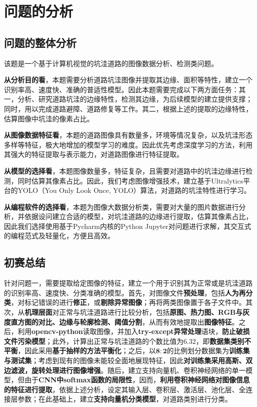 \documentclass{MathorCupmodeling}
\begin{document}
	\section{问题的分析}
	\subsection{问题的整体分析}
	该题是一个基于计算机视觉的坑洼道路的图像数据分析、检测类问题。

	\textbf{从分析目的看}，本题需要分析道路坑洼图像并提取其边缘、面积等特性，建立一个识别率高、速度快、准确的普适性模型。因此本题需要完成以下两方面任务：{\heiti 其一}，分析、研究道路坑洼的边缘特性，检测其边缘，为后续模型的建立提供支撑；同时，用以完成道路避障、道路修复等工作。{\heiti 其二}，根据上述的提取的边缘特性，估算图像中坑洼的像素占比。

	\textbf{从图像数据特征看}，本题的道路图像具有数量多，环境等情况复杂，以及坑洼形态多样等特征，极大地增加的模型学习的难度。因此优先考虑深度学习的方法，利用其强大的特征提取与表示能力，对道路图像进行特征提取。

	\textbf{从模型的选择看}，本题图像数量多，特征复杂，且需要对道路中的坑洼边缘进行检测，同时估算其像素占比。因此，我们考虑图像增强技术，建立基于Ultralytics平台的YOLO（You Only Look Once, YOLO）算法，对道路的坑洼特性进行学习。

	\textbf{从编程软件的选择看}，本题为图像大数据分析类，需要对大量的图片数据进行分析，并依据设问建立合适的模型，对坑洼道路的边缘进行提取，估算其像素占比，因此我们选择使用基于Pycharm内核的Python Jupyter对问题进行求解，其交互式的编程范式及轻量化，方便且高效。
	\subsection{初赛总结}
		{\heiti 针对问题一}，需要提取给定图像的特征，建立一个用于识别其为正常或是坑洼道路的识别率高、速度快、分类准确的模型。首先，对图像文件\textbf{预处理}，包括\textbf{人为再分类}，对标记错误的进行\textbf{修正}，或\textbf{剔除异常图像}；再将两类图像置于各子文件中。其次，从\textbf{机理层面}对正常与坑洼道路进行比较分析，包括\textbf{原图、热力图、RGB与灰度直方图的对比、边缘与轮廓检测、阈值分割}，从而有效地提取出\textbf{图像特征}。之后，利用\textbf{opencv-python}读取图像，并加入\textbf{try-except异常处理}语块，\textbf{防止破损文件污染模型}；此外，计算出正常与坑洼道路的个数比值为$\boldsymbol{6.32}$，即\textbf{数据集类别不平衡}，因此采用\textbf{基于抽样的方法平衡化}；之后，以$\boldsymbol{8:2}$的比例划分数据集为\textbf{训练集与测试集}；考虑到现有的图像未能较全面地展现特征，因此\textbf{对训练集采用高斯、双边滤波，旋转处理进行图像增强}。随后，建立支持向量机、卷积神经网络的单一模型，但由于\textbf{CNN中softmax函数的局限性}，因而，\textbf{利用卷积神经网络对图像信息的特征进行提取}，依据上述分析，设定其输入层、卷积层、激活层、池化层、全连接层参数；在此基础上，建立\textbf{支持向量机分类模型}，对道路类别进行分类。
\end{document}
